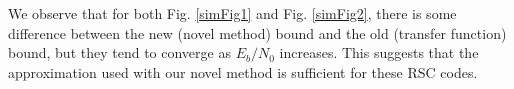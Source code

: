 
We observe that for both Fig. \ref{simFig1} and Fig. \ref{simFig2}, there is some difference between the new (novel method) bound and the old (transfer function) bound, but they tend to converge as $E_b/N_0$ increases. This suggests that the approximation used with our novel method is sufficient for these RSC codes.




